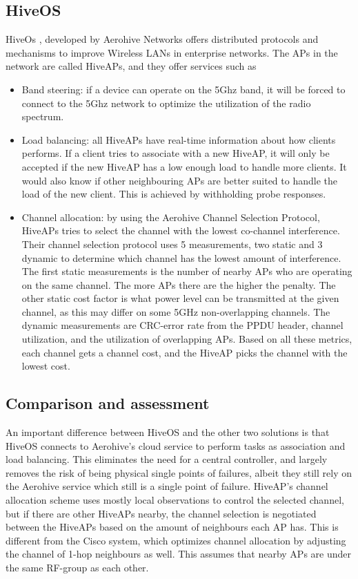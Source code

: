 \subsection{HiveOS}
HiveOs \cite{Aerohive}, developed by Aerohive Networks offers distributed protocols and mechanisms to improve Wireless LANs in enterprise networks. The APs 
in the network are called HiveAPs, and they offer services such as
\begin{itemize}
	\item Band steering: if a device can operate on the 5Ghz band, it will be forced to connect to the 5Ghz network to optimize the utilization of the radio spectrum. 
	\item Load balancing: all HiveAPs have real-time information about how clients performs. If a client tries to associate with a new HiveAP, it will only be accepted
				if the new HiveAP has a low enough load to handle more clients. It would also know if other neighbouring APs are better suited to handle the load of the new client.
				This is achieved by withholding probe responses.

	\item Channel allocation: by using the Aerohive Channel Selection Protocol, HiveAPs tries to select the channel with the lowest co-channel interference. Their channel selection protocol uses 5 measurements, two static and 3 dynamic to determine which channel has the lowest amount of interference.
	The first static measurements is the number of nearby APs who are operating on the same channel. The more APs there are the higher the penalty.
		The other static cost factor is what power level can be transmitted at the given channel, as this may differ on some 5GHz non-overlapping channels.
		The dynamic measurements are CRC-error rate from the PPDU header, channel utilization, and the utilization of overlapping APs. 
		Based on all these metrics, each channel gets a channel cost, and the HiveAP picks the channel with the lowest cost. 


\end{itemize}
\subsection{Comparison and assessment}
		An important difference between HiveOS and the other two solutions is that HiveOS connects to Aerohive's cloud service to perform tasks as association and load balancing.
		This eliminates the need for a central controller, and largely removes the risk of being physical single points of failures, albeit they still rely on the Aerohive service
		which still is a single point of failure. 
		HiveAP's channel allocation scheme uses mostly local observations to control the selected channel, but if there are other HiveAPs nearby, the channel selection is negotiated between the HiveAPs
		based on the amount of neighbours each AP has. This is different from the Cisco system, which optimizes channel allocation by adjusting the channel of 1-hop neighbours as well. This
		assumes that nearby APs are under the same RF-group as each other.

